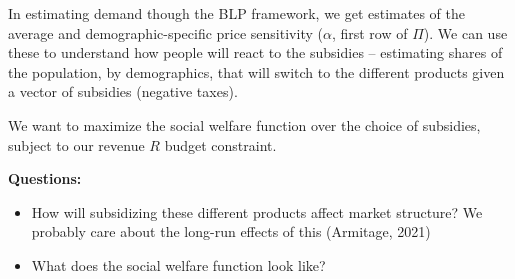 \documentclass[12pt]{article}
\begin{document}
In estimating demand though the BLP framework, we get estimates of the average and demographic-specific price sensitivity ($\alpha$, first row of $\Pi$). We can use these to understand how people will react to the subsidies -- estimating shares of the population, by demographics, that will switch to the different products given a vector of subsidies (negative taxes).

We want to maximize the social welfare function over the choice of subsidies, subject to our revenue $R$ budget constraint.

\textbf{Questions:}
\begin{itemize}
    \item How will subsidizing these different products affect market structure? We probably care about the long-run effects of this (Armitage, 2021)
    \item What does the social welfare function look like?
\end{itemize}
\end{document}
